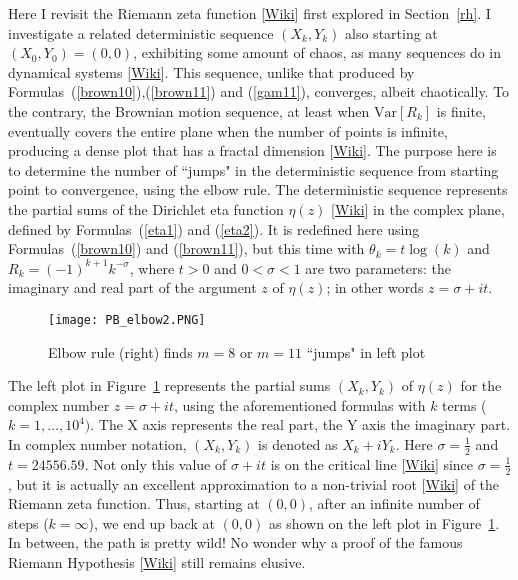 \documentclass[10pt]{article}
\begin{document}
\noindent Here I revisit the \textcolor{index}{Riemann zeta function} [\href{https://en.wikipedia.org/wiki/Riemann_zeta_function}{Wiki}] first explored in Section~\ref{rh}. I investigate a related deterministic sequence $(X_k,Y_k)$ also starting at $(X_0,Y_0)=(0,0)$, exhibiting some amount of chaos, as many sequences do in \textcolor{index}{dynamical systems} [\href{https://en.wikipedia.org/wiki/Dynamical_system}{Wiki}]. This sequence, unlike that produced by Formulas~(\ref{brown10}),(\ref{brown11}) and (\ref{gam11}), converges, albeit chaotically. To the contrary, the Brownian motion sequence, at least when $\mbox{Var}[R_k]$ is finite, eventually covers the entire
plane when the number of points is infinite, producing a dense plot that has a \textcolor{index}{fractal dimension} [\href{https://en.wikipedia.org/wiki/Fractal_dimension}{Wiki}]. The purpose here is to determine the number of ``jumps"
in the deterministic sequence from starting point to convergence, using the elbow rule. The deterministic sequence represents the partial sums of the
\textcolor{index}{Dirichlet eta function} $\eta(z)$ [\href{https://en.wikipedia.org/wiki/Dirichlet_eta_function}{Wiki}]
 in the complex plane, defined by Formulas~(\ref{eta1}) and (\ref{eta2}). It is redefined here using Formulas~(\ref{brown10}) and (\ref{brown11}), but this time with
$\theta_k = t \log(k)$ and $R_k=(-1)^{k+1}k^{-\sigma}$, where $t>0$ and $0<\sigma<1$ are two parameters: the imaginary and real part of the argument $z$ of $\eta(z)$; in other words $z=\sigma+it$.

\begin{figure}[H]
\centering
\texttt{[image: PB\_elbow2.PNG]}
\caption{Elbow rule (right) finds $m = 8$ or $m=11$ ``jumps" in left plot}
\label{fig:pbelbow2}
\end{figure}

The left plot in Figure~\ref{fig:pbelbow2} represents the partial sums $(X_k, Y_k)$ of $\eta(z)$ for the complex number $z=\sigma + it$, using the aforementioned formulas with $k$ terms ($k=1,\dots,10^4)$. The X axis represents the real part, the Y axis the imaginary part. In complex number notation, $(X_k,Y_k)$ is denoted as
$X_k + i Y_k$. Here $\sigma=\frac{1}{2}$ and $t=\num{24556.59}$. Not only this value of $\sigma + it$ is on the critical line
[\href{https://mathworld.wolfram.com/CriticalLine.html}{Wiki}]  since $\sigma=\frac{1}{2}$, but it is actually an excellent approximation to a non-trivial root
[\href{https://mathworld.wolfram.com/RiemannZetaFunctionZeros.html}{Wiki}] of the Riemann zeta function. Thus, starting at $(0,0)$,
after an infinite number of steps ($k=\infty$), we end up back at $(0,0)$ as shown on the left plot in Figure~\ref{fig:pbelbow2}. In between, the path is pretty wild!
No wonder why a proof of the famous Riemann Hypothesis [\href{https://en.wikipedia.org/wiki/Riemann_hypothesis}{Wiki}] still remains elusive.
\end{document}
